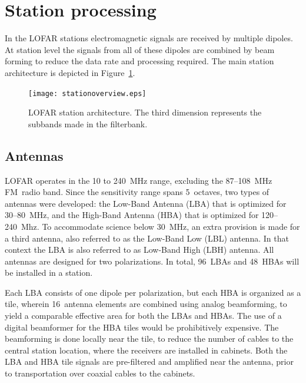 \documentclass[journal]{IEEEtran}
\begin{document}

\section{Station processing}

In the LOFAR stations electromagnetic signals are received by multiple dipoles. At station level the signals from all of these dipoles are combined by beam forming to reduce the data rate and processing required. The main station architecture is depicted in Figure~\ref{fig:stationarch}. 

\begin{figure}
\begin{center}
\texttt{[image: stationoverview.eps]}
\end{center}
\caption{LOFAR station architecture. The third dimension represents the subbands made in the filterbank.}
\label{fig:stationarch}
\end{figure}

\subsection{Antennas}

LOFAR operates in the 10 to 240~MHz range, excluding the 87--108~MHz FM~radio
band.
Since the sensitivity range spans 5~octaves, two types of antennas were
developed:
the Low-Band Antenna (LBA) that is optimized for 30--80~MHz,
and the High-Band Antenna (HBA) that is optimized for 120--240~Mhz.
To accommodate science below 30~MHz, an extra provision is made for a
third antenna, also referred to as the Low-Band Low (LBL) antenna.
In that context the LBA is also referred to as Low-Band High (LBH) antenna.
All antennas are designed for two polarizations.
In total, 96~LBAs and 48~HBAs will be installed in a station. 

Each LBA consists of one dipole per polarization, but
each HBA is organized as a tile, wherein 16~antenna elements are combined using
analog beamforming, to yield a comparable effective area for both the LBAs and
HBAs.
The use of a digital beamformer for the HBA tiles would be prohibitively
expensive.
The beamforming is done locally near the tile, to reduce the number of cables
to the central station location, where the receivers are installed in cabinets.
Both the LBA and HBA tile signals are pre-filtered and amplified near the
antenna, prior to transportation over coaxial cables to the cabinets.
\end{document}
